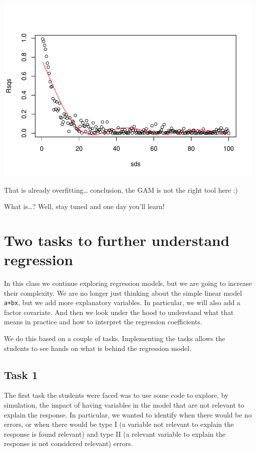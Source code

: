 \documentclass[
]{book}
\begin{document}
\includegraphics{ECOMODbook_files/figure-latex/a6.34-1.pdf}

That is already overfitting\ldots{} conclusion, the GAM is not the right tool here :)

What is\ldots? Well, stay tuned and one day you'll learn!

\hypertarget{aula7}{%
\chapter{Two tasks to further understand regression}\label{aula7}}

In this class we continue exploring regression models, but we are going to increase their complexity. We are no longer just thinking about the simple linear model \texttt{a+bx}, but we add more explanatory variables. In particular, we will also add a factor covariate. And then we look under the hood to understand what that means in practice and how to interpret the regression coefficients.

We do this based on a couple of tasks. Implementing the tasks allows the students to see hands on what is behind the regression model.

\hypertarget{task-1}{%
\section{Task 1}\label{task-1}}

The first task the students were faced was to use some code to explore, by simulation, the impact of having variables in the model that are not relevant to explain the response. In particular, we wanted to identify when there would be no errors, or when there would be type I (a variable not relevant to explain the response is found relevant) and type II (a relevant variable to explain the response is not considered relevant) errors.
\end{document}
